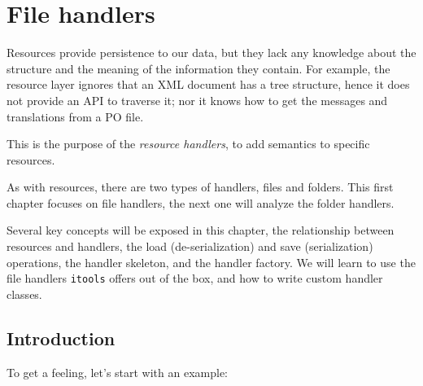 \chapter{File handlers}

Resources provide persistence to our data, but they lack any knowledge
about the structure and the meaning of the information they contain. For
example, the resource layer ignores that an XML document has a tree
structure, hence it does not provide an API to traverse it; nor it knows
how to get the messages and translations from a PO file.

This is the purpose of the {\em resource handlers}, to add semantics to
specific resources.

As with resources, there are two types of handlers, files and folders.
This first chapter focuses on file handlers, the next one will analyze
the folder handlers.

Several key concepts will be exposed in this chapter, the relationship
between resources and handlers, the load (de-serialization) and save
(serialization) operations, the handler skeleton, and the handler factory.
We will learn to use the file handlers {\tt itools} offers out of the box,
and how to write custom handler classes.


\section{Introduction}

To get a feeling, let's start with an example:

